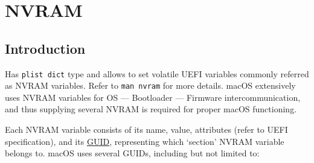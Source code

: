 \documentclass[]{article}
\makeatletter
\providecommand{\DIFaddtex}[1]{{\protect\color{blue}\uwave{#1}}} %
\providecommand{\DIFdeltex}[1]{{\protect\color{red}\sout{#1}}}                      %
\renewcommand{\label}[1]{%
\zref@wrapper@immediate{\oldlabel{#1}}}  %
\providecommand{\DIFaddbegin}{\global\booltrue{DIFkeeppage}\global\booltrue{DIFchange}} %
\providecommand{\DIFaddend}{\global\booltrue{DIFkeeppage}\global\boolfalse{DIFchange}} %
\providecommand{\DIFdelbegin}{\global\booltrue{DIFkeeppage}\global\booltrue{DIFchange}} %
\providecommand{\DIFdelend}{\global\booltrue{DIFkeeppage}\global\boolfalse{DIFchange}} %
\providecommand{\DIFadd}[1]{\texorpdfstring{\DIFaddtex{#1}}{#1}} %
\providecommand{\DIFdel}[1]{\texorpdfstring{\DIFdeltex{#1}}{}} %
\makeatother
\begin{document}

\section{NVRAM}\label{nvram}

\subsection{Introduction}\label{nvramintro}

Has \texttt{plist\ dict} type and allows to set volatile UEFI variables
commonly referred as NVRAM variables. Refer to \texttt{man\ nvram} for
more details. macOS extensively uses NVRAM variables for OS --- Bootloader
--- Firmware intercommunication, and thus supplying several NVRAM is
required for proper macOS functioning.

Each NVRAM variable consists of its name, value, attributes (refer to
UEFI specification), and its
\href{https://en.wikipedia.org/wiki/Universally_unique_identifier}{GUID},
representing which `section' NVRAM variable belongs to. macOS uses
several GUIDs, including but not limited to:
\end{document}
